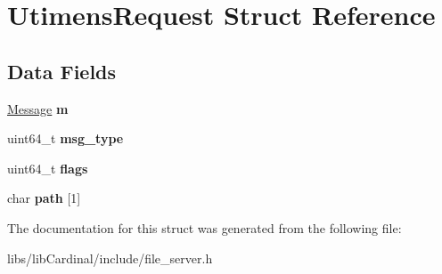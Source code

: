 \hypertarget{structUtimensRequest}{}\section{Utimens\+Request Struct Reference}
\label{structUtimensRequest}
\subsection*{Data Fields}
\begin{DoxyCompactItemize}
\item 
\hyperlink{structMessage}{Message} {\bfseries m}\hypertarget{structUtimensRequest_aae2fec3c668675435010855e8fec475b}{}\label{structUtimensRequest_aae2fec3c668675435010855e8fec475b}

\item 
uint64\+\_\+t {\bfseries msg\+\_\+type}\hypertarget{structUtimensRequest_a8bf0ad49a1a720ec9b311a5d79fee94d}{}\label{structUtimensRequest_a8bf0ad49a1a720ec9b311a5d79fee94d}

\item 
uint64\+\_\+t {\bfseries flags}\hypertarget{structUtimensRequest_a6357b7adb305c4908e4c8fe092b6ebc3}{}\label{structUtimensRequest_a6357b7adb305c4908e4c8fe092b6ebc3}

\item 
char {\bfseries path} \mbox{[}1\mbox{]}\hypertarget{structUtimensRequest_aa8ec877bc5e047180df8058663fab5d6}{}\label{structUtimensRequest_aa8ec877bc5e047180df8058663fab5d6}

\end{DoxyCompactItemize}


The documentation for this struct was generated from the following file\+:\begin{DoxyCompactItemize}
\item 
libs/lib\+Cardinal/include/file\+\_\+server.\+h\end{DoxyCompactItemize}
